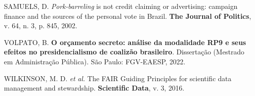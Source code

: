 \documentclass[12pt,a4paper,oneside]{article}
\begin{document}
\begin{singlespace}
\noindent\hangindent=1.25cm
SAMUELS, D. \textit{Pork-barreling} is not credit claiming or
advertising: campaign finance and the sources of the personal vote in
Brazil. \textbf{The Journal of Politics}, v. 64, n. 3,
p. 845, 2002.\par\smallskip

\noindent\hangindent=1.25cm
VOLPATO, B. \textbf{O orçamento secreto: análise da modalidade RP9 e
seus efeitos no presidencialismo de coalizão brasileiro}. Dissertação
(Mestrado em Administração Pública). São Paulo: FGV-EAESP, 2022.
\par\smallskip

\noindent\hangindent=1.25cm
WILKINSON, M. D. \textit{et al.} The FAIR Guiding Principles for
scientific data management and stewardship. \textbf{Scientific Data},
v. 3, 2016.
\end{singlespace}
\end{document}
